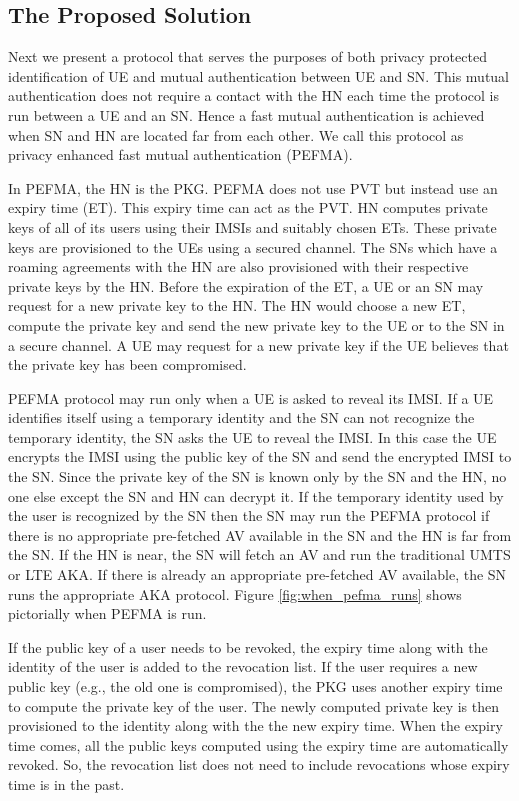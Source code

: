 \documentclass{river-journal}
\begin{document}
\subsection{The Proposed Solution}
Next we present a protocol that serves the purposes of both privacy protected identification of UE and mutual authentication between UE and SN. This mutual authentication does not require a contact with the HN each time the protocol is run between a UE and an SN. Hence a fast mutual authentication is achieved when SN and HN are located far from each other. We call this protocol as privacy enhanced fast mutual authentication (PEFMA).


In PEFMA, the HN is the PKG. PEFMA does not use PVT but instead use an expiry time (ET). This expiry time can act as the PVT. HN computes private keys of all of its users using their IMSIs and suitably chosen ETs. These private keys are provisioned to the UEs using a secured channel. The SNs which have a roaming agreements with the HN are also provisioned with their respective private keys by the HN. Before the expiration of the ET, a UE or an SN may request for a new private key to the HN. The HN would choose a new ET, compute the private key and send the new private key to the UE or to the SN in a secure channel. A UE may request for a new private key if the UE believes that the private key has been compromised.


PEFMA protocol may run only when a UE is asked to reveal its IMSI. If a UE identifies itself using a temporary identity and the SN can not recognize the temporary identity, the SN asks the UE to reveal the IMSI. In this case the UE encrypts the IMSI using the public key of the SN and send the encrypted IMSI to the SN. Since the private key of the SN is known only by the SN and the HN, no one else except the SN and HN can decrypt it. If the temporary identity used by the user is recognized by the SN then the SN may run the PEFMA protocol if there is no appropriate pre-fetched AV available in the SN and the HN is far from the SN. If the HN is near, the SN will fetch an AV and run the traditional UMTS or LTE AKA. If there is already an appropriate pre-fetched AV available, the SN runs the appropriate AKA protocol. Figure \ref{fig:when_pefma_runs} shows pictorially when PEFMA is run.


If the public key of a user needs to be revoked, the expiry time along with the identity of the user is added to the revocation list. If the user requires a new public key (e.g., the old one is compromised), the PKG uses another expiry time to compute the private key of the user. The newly computed private key is then provisioned to the identity along with the the new expiry time. When the expiry time comes, all the public keys computed using the expiry time are automatically revoked. So, the revocation list does not need to include revocations whose expiry time is in the past. 
\end{document}
